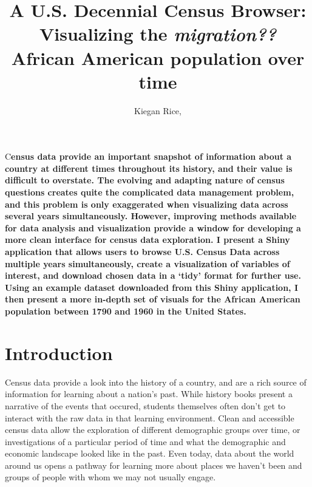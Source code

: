 \documentclass[DIV=calc, paper=a4, fontsize=10pt, twocolumn]{scrartcl}\usepackage[]{graphicx}\usepackage[]{color}
\title{A U.S. Decennial Census Browser: Visualizing the \textit{migration??} African American population over time} %
\author{Kiegan Rice, } %
\date{} %
\newcommand{\initial}[1]{ %
\lettrine[lines=3,lhang=0.3,nindent=0em]{
\color{black}
{\textsf{#1}}}{}}
\begin{document}


\maketitle %

\thispagestyle{fancy} %


\vspace{-1cm}


\initial{C}\textbf{ensus data provide an important snapshot of information about a country at different times throughout its history, and their value is difficult to overstate. The evolving and adapting nature of census questions creates quite the complicated data management problem, and this problem is only exaggerated when visualizing data across several years simultaneously. However, improving methods available for data analysis and visualization provide a window for developing a more clean interface for census data exploration. I present a Shiny application that allows users to browse U.S. Census Data across multiple years simultaneously, create a visualization of variables of interest, and download chosen data in a `tidy' format for further use. Using an example dataset downloaded from this Shiny application, I then present a more in-depth set of visuals for the African American population between 1790 and 1960 in the United States.}  

\section*{Introduction}

Census data provide a look into the history of a country, and are a rich source of information for learning about a nation's past. While history books present a narrative of the events that occured, students themselves often don't get to interact with the raw data in that learning environment. Clean and accessible census data allow the exploration of different demographic groups over time, or investigations of a particular period of time and what the demographic and economic landscape looked like in the past. Even today, data about the world around us opens a pathway for learning more about places we haven't been and groups of people with whom we may not usually engage.  
\end{document}
